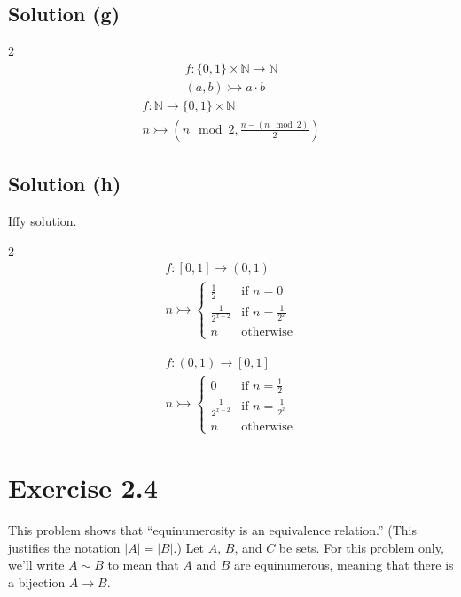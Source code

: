 \documentclass[12pt]{report}
\begin{document}
\subsection{Solution (g)}
\begin{multicols}{2}
    \begin{gather}
        f : \{0, 1\} \times \mathbb{N} \to \mathbb{N}\\
        (a,b) \rightarrowtail a \cdot b
    \end{gather}
    \columnbreak
    \begin{gather}
        f : \mathbb{N} \to \{0, 1\} \times \mathbb{N}\\
        n \rightarrowtail \left(n \mod 2, \frac{n - (n \mod 2)}{2}\right)
    \end{gather}
\end{multicols}

\subsection{Solution (h)}
Iffy solution. 
\begin{multicols}{2}
    \begin{gather}
        f : [0, 1] \to (0, 1)\\
        n \rightarrowtail \begin{cases}
            \frac{1}{2} & \text{if } n=0\\
            \frac{1}{2^{x+2}} & \text{if } n=\frac{1}{2^x}\\
            n    &   \text{otherwise}
        \end{cases}
    \end{gather}

    \columnbreak
    \begin{gather}
        f : (0, 1) \to [0,1]\\
        n \rightarrowtail \begin{cases}
            0 & \text{if } n=\frac{1}{2}\\
            \frac{1}{2^{x-2}} & \text{if } n=\frac{1}{2^x}\\
            n    &   \text{otherwise}
        \end{cases}
    \end{gather}
\end{multicols}

\pagebreak
\section{Exercise 2.4}
This problem shows that ``equinumerosity is an equivalence relation.'' (This justifies the notation $|A| = |B|$.) Let $A$, $B$, and $C$ be sets. For this problem only, we'll write $A \sim B$ to mean that $A$ and $B$ are equinumerous, meaning that there is a bijection $A \to B$. 
\end{document}
